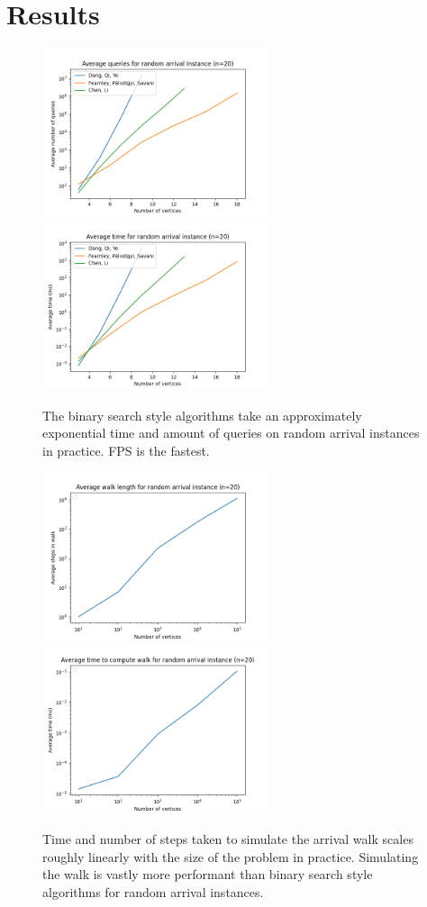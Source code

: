 \section{Results} \label{resultsSec}
  \vspace{-15pt}
  \begin{figure}[H]
      \centering
      \includegraphics[width=2.6in]{plots/arrival_queries.png}
      \centering
      \includegraphics[width=2.6in]{plots/arrival_time.png}
      \caption{The binary search style algorithms take an approximately
      exponential time and amount of queries on random arrival instances in practice. FPS is the fastest.} \label{arrivalMainPlot}
  \end{figure}
  \vspace{-22pt}
  \begin{figure}[H]
      \centering
      \includegraphics[width=2.6in]{plots/arrival_steps.png}
      \centering
      \includegraphics[width=2.6in]{plots/arrival_wtime.png}
      \caption{ Time and number of steps taken to simulate the arrival
      walk scales roughly linearly with the size of the problem in practice. Simulating
      the walk is vastly more performant than binary search style algorithms for random arrival instances.} \label{arrivalWalkPlot}
  \end{figure}

